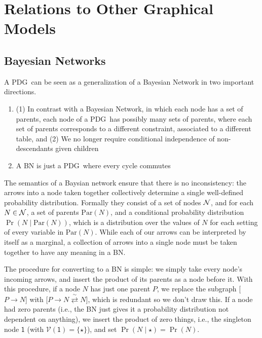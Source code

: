 \documentclass{article}
\newcommand\changeon{\color{note-fg} }
\newcommand\changeoff{\color{black} }
\newcommand{\MN}{PDG}%
\begin{document}
	\section{Relations to Other Graphical Models}\label{sec:other-graphical-models}
	
	\subsection{Bayesian Networks} \label{sec:bn-convert}
	\changeon	
	A \MN\ can be seen as a generalization of a Bayesian Network in two important directions. 
	
	\begin{enumerate}
		\item (1) In contrast with a Bayesian Network, in which each node has a set of parents, each node of a \MN\ has possibly many sets of parents, where each set of parents corresponds to a different constraint, associated to a different table, and (2) We no longer require conditional independence of non-descendants given children
		
		\item A BN is just a \MN\ where every cycle commutes
		
		
	\end{enumerate}
	\changeoff
	
	
	The semantics of a Baysian network ensure that there is no inconsistency: the arrows into a node taken together collectively determine a single well-defined probability distribution. Formally they consist of a set of nodes $\cal N$, and for each $N \in \cal N$, a set of parents $\mathrm{Par}(N)$, and a conditional probability distribution $\Pr( N \mid \mathrm{Par}(N))$, which is a distribution over the values of $N$ for each setting of every variable in $\mathrm{Par}(N)$. While each of our arrows can be interpreted by itself as a marginal, a collection of arrows into a single node must be taken together to have any meaning in a BN. 
	
	The procedure for converting to a BN is simple: we simply take every node's incoming arrows, and insert the product of its parents as a node before it. With this procedure, if a node $N$ has just one parent $P$, we replace the subgraph [$P \to N$] with [$P \to N \stackrel\sim\rightleftarrows N$], which is redundant so we don't draw this. If a node had zero parents (i.e., the BN just gives it a probability distribution not dependent on anything), we insert the product of zero things, i.e., the singleton node $\mathsf 1$ (with $\mathcal V(\mathsf 1) = \{\star \}$), and set $\Pr(N \mid \star) = \Pr(N)$. 
	
\end{document}
